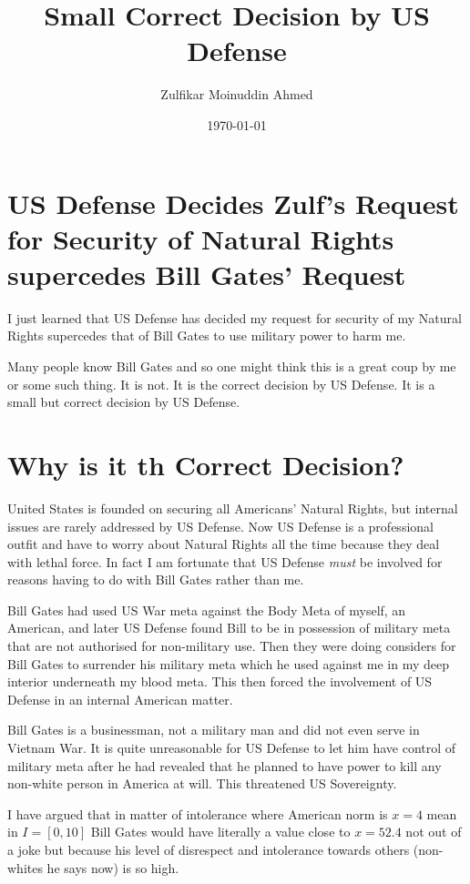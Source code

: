 \documentclass{amsart}
\title{Small Correct Decision by US Defense}
\author{Zulfikar Moinuddin Ahmed}
\date{\today}
\begin{document}
\maketitle

\section{US Defense Decides Zulf's Request for Security of Natural Rights supercedes Bill Gates' Request}

I just learned that US Defense has decided my request for security of my Natural Rights supercedes that of Bill Gates to use military power to harm me.

Many people know Bill Gates and so one might think this is a great coup by me or some such thing.  It is not.  It is the correct decision by US Defense.  It is a small but correct decision by US Defense.  

\section{Why is it th Correct Decision?}

United States is founded on securing all Americans' Natural Rights, but internal issues are rarely addressed by US Defense.  Now US Defense is a professional outfit and have to worry about Natural Rights all the time because they deal with lethal force.  In fact I am fortunate that US Defense {\em must} be involved for reasons having to do with Bill Gates rather than me.  

Bill Gates had used US War meta against the Body Meta of myself, an American, and later US Defense found Bill to be in possession of military meta that are not authorised for non-military use.  Then they were doing considers for Bill Gates to surrender his military meta which he used against me in my deep interior underneath my blood meta.  This then forced the involvement of US Defense in an internal American matter.

Bill Gates is a businessman, not a military man and did not even serve in Vietnam War.  It is quite unreasonable for US Defense to let him have control of military meta after he had revealed that he planned to have power to kill any non-white person in America at will.  This threatened US Sovereignty.  

I have argued that in matter of intolerance where American norm is $x=4$ mean in $I=[0,10]$ Bill Gates would have literally a value close to $x=52.4$ not out of a joke but because his level of disrespect and intolerance towards others (non-whites he says now) is so high.  
\end{document}
